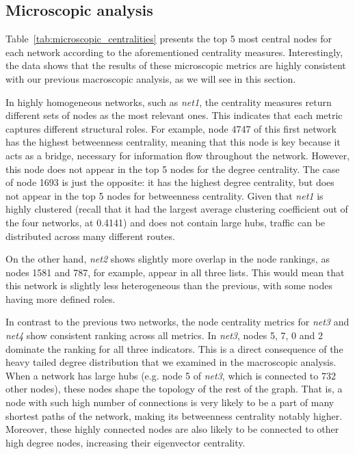 \documentclass{article}
\begin{document}
\subsection{Microscopic analysis}

Table~\ref{tab:microscopic_centralities} presents the top 5 most central nodes for each network according to the aforementioned centrality measures. Interestingly, the data shows that the results of these microscopic metrics are highly consistent with our previous macroscopic analysis, as we will see in this section.

In highly homogeneous networks, such as \textit{net1}, the centrality measures return different sets of nodes as the most relevant ones. This indicates that each metric captures different structural roles. For example, node 4747 of this first network has the highest betweenness centrality, meaning that this node is key because it acts as a bridge, necessary for information flow throughout the network. However, this node does not appear in the top 5 nodes for the degree centrality. The case of node 1693 is just the opposite: it has the highest degree centrality, but does not appear in the top 5 nodes for betweenness centrality. Given that \textit{net1} is highly clustered (recall that it had the largest average clustering coefficient out of the four networks, at 0.4141) and does not contain large hubs, traffic can be distributed across many different routes.

On the other hand, \textit{net2} shows slightly more overlap in the node rankings, as nodes 1581 and 787, for example, appear in all three lists. This would mean that this network is slightly less heterogeneous than the previous, with some nodes having more defined roles.

In contrast to the previous two networks, the node centrality metrics for \textit{net3} and \textit{net4} show consistent ranking across all metrics. In \textit{net3}, nodes 5, 7, 0 and 2 dominate the ranking for all three indicators. This is a direct consequence of the heavy tailed degree distribution that we examined in the macroscopic analysis. When a network has large hubs (e.g. node 5 of \textit{net3}, which is connected to 732 other nodes), these nodes shape the topology of the rest of the graph. That is, a node with such high number of connections is very likely to be a part of many shortest paths of the network, making its betweenness centrality notably higher. Moreover, these highly connected nodes are also likely to be connected to other high degree nodes, increasing their eigenvector centrality. 
\end{document}

